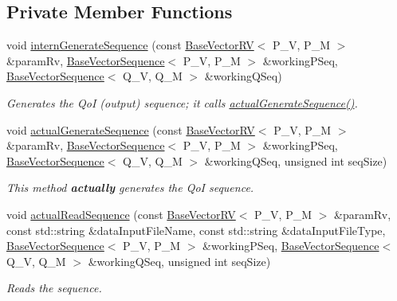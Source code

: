 \subsection*{Private Member Functions}
\begin{DoxyCompactItemize}
\item 
void \hyperlink{class_q_u_e_s_o_1_1_monte_carlo_s_g_ad0a5e608dd814fbc17237a267c6d5827}{intern\-Generate\-Sequence} (const \hyperlink{class_q_u_e_s_o_1_1_base_vector_r_v}{Base\-Vector\-R\-V}$<$ P\-\_\-\-V, P\-\_\-\-M $>$ \&param\-Rv, \hyperlink{class_q_u_e_s_o_1_1_base_vector_sequence}{Base\-Vector\-Sequence}$<$ P\-\_\-\-V, P\-\_\-\-M $>$ \&working\-P\-Seq, \hyperlink{class_q_u_e_s_o_1_1_base_vector_sequence}{Base\-Vector\-Sequence}$<$ Q\-\_\-\-V, Q\-\_\-\-M $>$ \&working\-Q\-Seq)
\begin{DoxyCompactList}\small\item\em Generates the Qo\-I (output) sequence; it calls \hyperlink{class_q_u_e_s_o_1_1_monte_carlo_s_g_a597d3e067242d2df4de08b7d2c1e3fd1}{actual\-Generate\-Sequence()}. \end{DoxyCompactList}\item 
void \hyperlink{class_q_u_e_s_o_1_1_monte_carlo_s_g_a597d3e067242d2df4de08b7d2c1e3fd1}{actual\-Generate\-Sequence} (const \hyperlink{class_q_u_e_s_o_1_1_base_vector_r_v}{Base\-Vector\-R\-V}$<$ P\-\_\-\-V, P\-\_\-\-M $>$ \&param\-Rv, \hyperlink{class_q_u_e_s_o_1_1_base_vector_sequence}{Base\-Vector\-Sequence}$<$ P\-\_\-\-V, P\-\_\-\-M $>$ \&working\-P\-Seq, \hyperlink{class_q_u_e_s_o_1_1_base_vector_sequence}{Base\-Vector\-Sequence}$<$ Q\-\_\-\-V, Q\-\_\-\-M $>$ \&working\-Q\-Seq, unsigned int seq\-Size)
\begin{DoxyCompactList}\small\item\em This method {\bfseries actually} generates the Qo\-I sequence. \end{DoxyCompactList}\item 
void \hyperlink{class_q_u_e_s_o_1_1_monte_carlo_s_g_ac0ff47f13f63c034eeb8dc39d2b0b13e}{actual\-Read\-Sequence} (const \hyperlink{class_q_u_e_s_o_1_1_base_vector_r_v}{Base\-Vector\-R\-V}$<$ P\-\_\-\-V, P\-\_\-\-M $>$ \&param\-Rv, const std\-::string \&data\-Input\-File\-Name, const std\-::string \&data\-Input\-File\-Type, \hyperlink{class_q_u_e_s_o_1_1_base_vector_sequence}{Base\-Vector\-Sequence}$<$ P\-\_\-\-V, P\-\_\-\-M $>$ \&working\-P\-Seq, \hyperlink{class_q_u_e_s_o_1_1_base_vector_sequence}{Base\-Vector\-Sequence}$<$ Q\-\_\-\-V, Q\-\_\-\-M $>$ \&working\-Q\-Seq, unsigned int seq\-Size)
\begin{DoxyCompactList}\small\item\em Reads the sequence. \end{DoxyCompactList}\end{DoxyCompactItemize}

